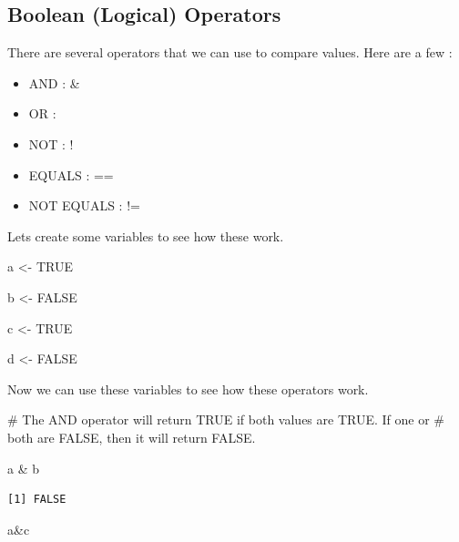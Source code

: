 \documentclass[
  letterpaper,
  DIV=11,
  numbers=noendperiod]{scrreprt}
\newenvironment{Shaded}{\begin{snugshade}}{\end{snugshade}}
\newcommand{\CommentTok}[1]{\textcolor[rgb]{0.37,0.37,0.37}{#1}}
\newcommand{\ConstantTok}[1]{\textcolor[rgb]{0.56,0.35,0.01}{#1}}
\newcommand{\NormalTok}[1]{\textcolor[rgb]{0.00,0.23,0.31}{#1}}
\newcommand{\OtherTok}[1]{\textcolor[rgb]{0.00,0.23,0.31}{#1}}
\newcommand{\SpecialCharTok}[1]{\textcolor[rgb]{0.37,0.37,0.37}{#1}}
\providecommand{\tightlist}{%
  \setlength{\itemsep}{0pt}\setlength{\parskip}{0pt}}\usepackage{longtable,booktabs,array}
\begin{document}
\subsection*{Boolean (Logical)
Operators}\label{boolean-logical-operators}

There are several operators that we can use to compare values. Here are
a few :

\begin{itemize}
\tightlist
\item
  AND : \&
\item
  OR : \textbar{}
\item
  NOT : !
\item
  EQUALS : ==
\item
  NOT EQUALS : !=
\end{itemize}

Lets create some variables to see how these work.

\begin{Shaded}
\begin{Highlighting}[]
\NormalTok{a }\OtherTok{\textless{}{-}} \ConstantTok{TRUE}

\NormalTok{b }\OtherTok{\textless{}{-}} \ConstantTok{FALSE}

\NormalTok{c }\OtherTok{\textless{}{-}} \ConstantTok{TRUE}

\NormalTok{d }\OtherTok{\textless{}{-}} \ConstantTok{FALSE}
\end{Highlighting}
\end{Shaded}

Now we can use these variables to see how these operators work.

\begin{Shaded}
\begin{Highlighting}[]
\CommentTok{\# The AND operator will return TRUE if both values are TRUE. If one or }
\CommentTok{\# both are FALSE, then it will return FALSE.}

\NormalTok{a }\SpecialCharTok{\&}\NormalTok{ b}
\end{Highlighting}
\end{Shaded}

\begin{verbatim}
[1] FALSE
\end{verbatim}

\begin{Shaded}
\begin{Highlighting}[]
\NormalTok{a}\SpecialCharTok{\&}\NormalTok{c}
\end{Highlighting}
\end{Shaded}
\end{document}
